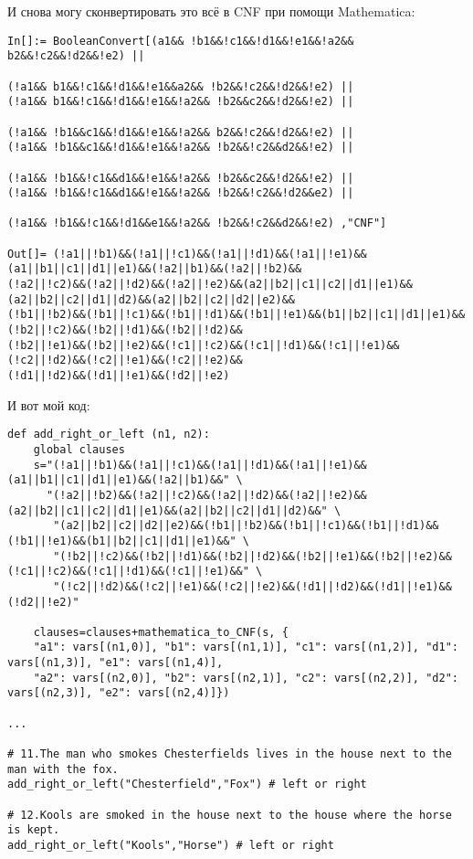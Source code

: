 И снова могу сконвертировать это всё в CNF при помощи Mathematica:

\begin{lstlisting}
In[]:= BooleanConvert[(a1&& !b1&&!c1&&!d1&&!e1&&!a2&& b2&&!c2&&!d2&&!e2) ||

(!a1&& b1&&!c1&&!d1&&!e1&&a2&& !b2&&!c2&&!d2&&!e2) ||
(!a1&& b1&&!c1&&!d1&&!e1&&!a2&& !b2&&c2&&!d2&&!e2) ||

(!a1&& !b1&&c1&&!d1&&!e1&&!a2&& b2&&!c2&&!d2&&!e2) ||
(!a1&& !b1&&c1&&!d1&&!e1&&!a2&& !b2&&!c2&&d2&&!e2) ||

(!a1&& !b1&&!c1&&d1&&!e1&&!a2&& !b2&&c2&&!d2&&!e2) ||
(!a1&& !b1&&!c1&&d1&&!e1&&!a2&& !b2&&!c2&&!d2&&e2) ||

(!a1&& !b1&&!c1&&!d1&&e1&&!a2&& !b2&&!c2&&d2&&!e2) ,"CNF"]

Out[]= (!a1||!b1)&&(!a1||!c1)&&(!a1||!d1)&&(!a1||!e1)&&(a1||b1||c1||d1||e1)&&(!a2||b1)&&(!a2||!b2)&&
(!a2||!c2)&&(!a2||!d2)&&(!a2||!e2)&&(a2||b2||c1||c2||d1||e1)&&(a2||b2||c2||d1||d2)&&(a2||b2||c2||d2||e2)&&
(!b1||!b2)&&(!b1||!c1)&&(!b1||!d1)&&(!b1||!e1)&&(b1||b2||c1||d1||e1)&&(!b2||!c2)&&(!b2||!d1)&&(!b2||!d2)&&
(!b2||!e1)&&(!b2||!e2)&&(!c1||!c2)&&(!c1||!d1)&&(!c1||!e1)&&(!c2||!d2)&&(!c2||!e1)&&(!c2||!e2)&&
(!d1||!d2)&&(!d1||!e1)&&(!d2||!e2)
\end{lstlisting}

И вот мой код:

\begin{lstlisting}
def add_right_or_left (n1, n2):
    global clauses
    s="(!a1||!b1)&&(!a1||!c1)&&(!a1||!d1)&&(!a1||!e1)&&(a1||b1||c1||d1||e1)&&(!a2||b1)&&" \
      "(!a2||!b2)&&(!a2||!c2)&&(!a2||!d2)&&(!a2||!e2)&&(a2||b2||c1||c2||d1||e1)&&(a2||b2||c2||d1||d2)&&" \
       "(a2||b2||c2||d2||e2)&&(!b1||!b2)&&(!b1||!c1)&&(!b1||!d1)&&(!b1||!e1)&&(b1||b2||c1||d1||e1)&&" \
       "(!b2||!c2)&&(!b2||!d1)&&(!b2||!d2)&&(!b2||!e1)&&(!b2||!e2)&&(!c1||!c2)&&(!c1||!d1)&&(!c1||!e1)&&" \
       "(!c2||!d2)&&(!c2||!e1)&&(!c2||!e2)&&(!d1||!d2)&&(!d1||!e1)&&(!d2||!e2)"
    
    clauses=clauses+mathematica_to_CNF(s, {
	"a1": vars[(n1,0)], "b1": vars[(n1,1)], "c1": vars[(n1,2)], "d1": vars[(n1,3)], "e1": vars[(n1,4)],
	"a2": vars[(n2,0)], "b2": vars[(n2,1)], "c2": vars[(n2,2)], "d2": vars[(n2,3)], "e2": vars[(n2,4)]})

...

# 11.The man who smokes Chesterfields lives in the house next to the man with the fox.
add_right_or_left("Chesterfield","Fox") # left or right

# 12.Kools are smoked in the house next to the house where the horse is kept.
add_right_or_left("Kools","Horse") # left or right
\end{lstlisting}

